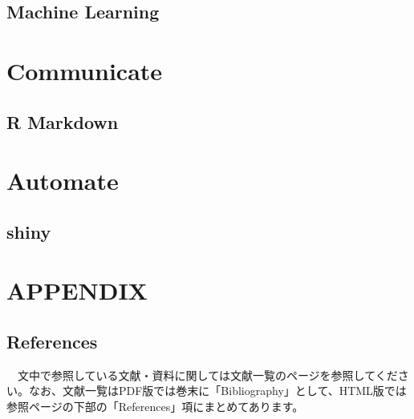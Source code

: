 \documentclass[
  12pt,
]{book}
\begin{document}
\hypertarget{machine-learning}{%
\chapter{Machine Learning}\label{machine-learning}}

\hypertarget{part-communicate}{%
\part{Communicate}\label{part-communicate}}

\hypertarget{r-markdown}{%
\chapter{R Markdown}\label{r-markdown}}

\hypertarget{part-automate}{%
\part{Automate}\label{part-automate}}

\hypertarget{shiny}{%
\chapter{shiny}\label{shiny}}

\hypertarget{part-appendix}{%
\part{APPENDIX}\label{part-appendix}}

\hypertarget{appendix-appendix}{%
\appendix {}}


\hypertarget{references}{%
\chapter{References}\label{references}}

　文中で参照している文献・資料に関しては文献一覧のページを参照してください。なお、文献一覧はPDF版では巻末に「Bibliography」として、HTML版では参照ページの下部の「References」項にまとめてあります。
\end{document}
